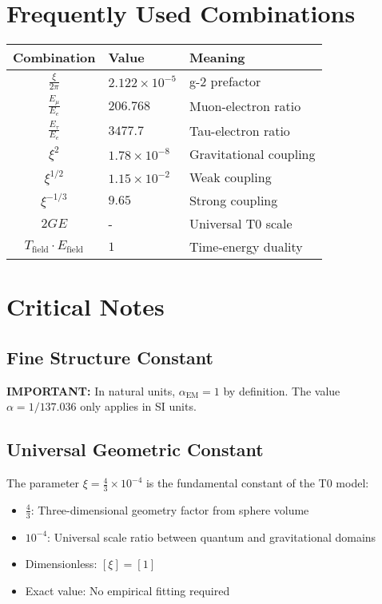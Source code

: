 \documentclass[12pt,a4paper]{report}
\begin{document}
\section{Frequently Used Combinations}
\label{sec:common_combinations}

\begin{longtable}{|c|l|l|}
	\hline
	\textbf{Combination} & \textbf{Value} & \textbf{Meaning} \\
	\hline
	$\frac{\xi}{2\pi}$ & $2.122 \times 10^{-5}$ & g-2 prefactor \\
	$\frac{E_\mu}{E_e}$ & $206.768$ & Muon-electron ratio \\
	$\frac{E_\tau}{E_e}$ & $3477.7$ & Tau-electron ratio \\
	$\xi^2$ & $1.78 \times 10^{-8}$ & Gravitational coupling \\
	$\xi^{1/2}$ & $1.15 \times 10^{-2}$ & Weak coupling \\
	$\xi^{-1/3}$ & $9.65$ & Strong coupling \\
	$2GE$ & - & Universal T0 scale \\
	$T_{\text{field}} \cdot E_{\text{field}}$ & $1$ & Time-energy duality \\
	\hline
\end{longtable}

\section{Critical Notes}
\label{sec:critical_notes}

\subsection{Fine Structure Constant}
\textbf{IMPORTANT:} In natural units, $\alpha_{\text{EM}} = 1$ by definition.
The value $\alpha = 1/137.036$ only applies in SI units.

\subsection{Universal Geometric Constant}
The parameter $\xi = \frac{4}{3} \times 10^{-4}$ is the fundamental constant of the T0 model:
\begin{itemize}
	\item $\frac{4}{3}$: Three-dimensional geometry factor from sphere volume
	\item $10^{-4}$: Universal scale ratio between quantum and gravitational domains
	\item Dimensionless: $[\xi] = [1]$
	\item Exact value: No empirical fitting required
\end{itemize}
\end{document}
